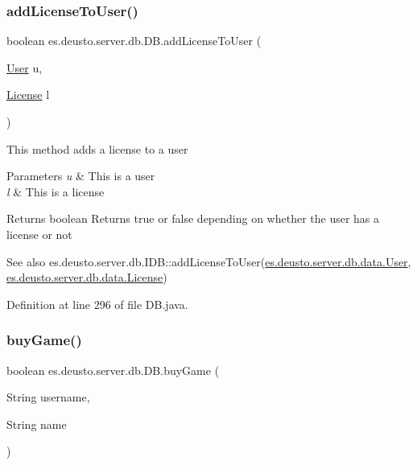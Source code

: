\subsubsection{\texorpdfstring{add\+License\+To\+User()}{addLicenseToUser()}}
{\footnotesize\ttfamily boolean es.\+deusto.\+server.\+db.\+D\+B.\+add\+License\+To\+User (\begin{DoxyParamCaption}\item[{\hyperlink{classes_1_1deusto_1_1server_1_1db_1_1data_1_1_user}{User}}]{u,  }\item[{\hyperlink{classes_1_1deusto_1_1server_1_1db_1_1data_1_1_license}{License}}]{l }\end{DoxyParamCaption})}

This method adds a license to a user 
\begin{DoxyParams}{Parameters}
{\em u} & This is a user \\
\hline
{\em l} & This is a license \\
\hline
\end{DoxyParams}
\begin{DoxyReturn}{Returns}
boolean Returns true or false depending on whether the user has a license or not 
\end{DoxyReturn}
\begin{DoxySeeAlso}{See also}
es.\+deusto.\+server.\+db.\+I\+D\+B\+::add\+License\+To\+User(\hyperlink{classes_1_1deusto_1_1server_1_1db_1_1data_1_1_user}{es.\+deusto.\+server.\+db.\+data.\+User}, \hyperlink{classes_1_1deusto_1_1server_1_1db_1_1data_1_1_license}{es.\+deusto.\+server.\+db.\+data.\+License}) 
\end{DoxySeeAlso}


Definition at line 296 of file D\+B.\+java.

\mbox{\label{classes_1_1deusto_1_1server_1_1db_1_1_d_b_a8aa2e7531181a31b54850ca6665f87c2}} 
\subsubsection{\texorpdfstring{buy\+Game()}{buyGame()}}
{\footnotesize\ttfamily boolean es.\+deusto.\+server.\+db.\+D\+B.\+buy\+Game (\begin{DoxyParamCaption}\item[{String}]{username,  }\item[{String}]{name }\end{DoxyParamCaption})}

